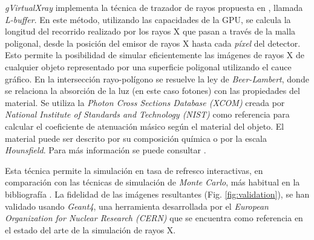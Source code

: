 \emph{gVirtualXray} implementa la técnica de trazador de rayos propuesta en \cite{Freud2006175}, llamada \emph{L-buffer}. En este método, utilizando las capacidades de la \ac{GPU}, se calcula la longitud del recorrido realizado por los rayos X que pasan a través de la malla poligonal, desde la posición del emisor de rayos X hasta cada \emph{píxel} del detector. Esto permite la posibilidad de simular eficientemente las imágenes de rayos X de cualquier objeto representado por una superficie poligonal utilizando el cauce gráfico. En la intersección rayo-polígono se resuelve la ley de \emph{Beer-Lambert}\cite{sujar:hal}, donde se relaciona la absorción de la luz (en este caso fotones) con las propiedades del material. Se utiliza la \emph{Photon Cross Sections Database (XCOM)} creada por \emph{National Institute of Standards and Technology (NIST)}\cite{XCOM} como referencia para calcular el coeficiente de atenuación másico según el material del objeto. El material puede ser descrito por su composición química o por la escala \emph{Hounsfield}.  %
Para más información se puede consultar \cite{vidal2009simulation}.

Esta técnica permite la simulación en tasa de refresco interactivas, en comparación con las técnicas de  simulación de \emph{Monte Carlo}, más habitual en la bibliografía \cite{PENELOPE,badal2009}. La fidelidad de las imágenes resultantes (Fig. \ref{fig:validation}), se han validado usando \emph{Geant4}\cite{Agostinelli2003250}, una herramienta desarrollada por el \emph{European Organization for Nuclear Research (CERN)} que se encuentra como referencia en el estado del arte de la simulación de rayos X.

